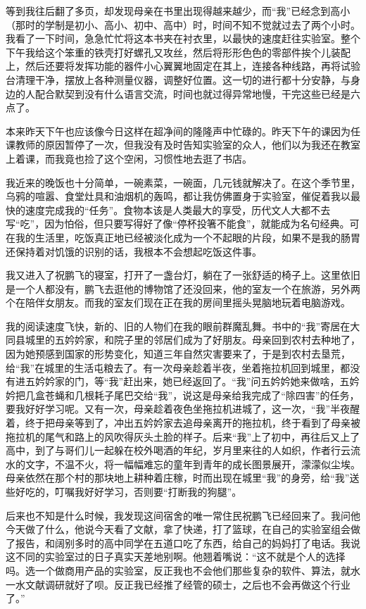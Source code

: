 \documentclass[openany,scheme = chinese, linespread = 1.5]{ctexbook}
\begin{document}
等到我往后翻了多页，却发现母亲在书里出现得越来越少，而“我”已经念到高小（那时的学制是初小、高小、初中、高中）时，时间不知不觉就过去了两个小时。我看了一下时间，急急忙忙将这本书夹在衬衣里，以最快的速度赶往实验室。整个下午我给这个笨重的铁壳打好螺孔又攻丝，然后将形形色色的零部件挨个儿装配上，然后还要将发挥功能的器件小心翼翼地固定在其上，连接各种线路，再将试验台清理干净，摆放上各种测量仪器，调整好位置。这一切的进行都十分安静，与身边的人配合默契到没有什么语言交流，时间也就过得异常地慢，干完这些已经是六点了。

本来昨天下午也应该像今日这样在超净间的隆隆声中忙碌的。昨天下午的课因为任课教师的原因暂停了一次，但我没有及时告知实验室的众人，他们以为我还在教室上着课，而我竟也捡了这个空闲，习惯性地去逛了书店。


我近来的晚饭也十分简单，一碗素菜，一碗面，几元钱就解决了。在这个季节里，乌鸦的喧嚣、食堂灶具和油烟机的轰鸣，都让我仿佛置身于实验室，催促着我以最快的速度完成我的“任务”。食物本该是人类最大的享受，历代文人大都不去写“吃”，因为怕俗，但只要写得好了像“停杯投箸不能食”，就能成为名句经典。可在我的生活里，吃饭真正地已经被淡化成为一个不起眼的片段，如果不是我的肠胃还保持着对饥饿的识别的话，我根本不会想起吃饭这件事。

我又进入了祝鹏飞的寝室，打开了一盏台灯，躺在了一张舒适的椅子上。这里依旧是一个人都没有，鹏飞去逛他的博物馆了还没回来，他的室友一个在旅游，另外两个在陪伴女朋友。而我的室友们现在正在我的房间里摇头晃脑地玩着电脑游戏。

我的阅读速度飞快，新的、旧的人物们在我的眼前群魔乱舞。书中的“我”寄居在大同县城里的五妗妗家，和院子里的邻居们成为了好朋友。母亲回到农村去种地了，因为她预感到国家的形势变化，知道三年自然灾害要来了，于是到农村去垦荒，给“我”在城里的生活屯粮去了。有一次母亲趁着半夜，坐着拖拉机回到城里，都没有进五妗妗家的门，等“我”赶出来，她已经返回了。“我”问五妗妗她来做啥，五妗妗把几盒苍蝇和几根耗子尾巴交给“我”，说这是母亲给我完成了“除四害”的任务，要我好好学习呢。又有一次，母亲趁着夜色坐拖拉机进城了，这一次，“我”半夜醒着，终于把母亲等到了，冲出五妗妗家去追母亲离开的拖拉机，终于看到了母亲被拖拉机的尾气和路上的风吹得灰头土脸的样子。后来“我”上了初中，再往后又上了高中，到了与哥们儿一起躲在校外喝酒的年纪，岁月里来往的人如织，作者行云流水的文字，不温不火，将一幅幅难忘的童年到青年的成长图景展开，濛濛似尘埃。母亲依然在那个村的那块地上耕种着庄稼，时而出现在城里“我”的身旁，给“我”送些好吃的，叮嘱我好好学习，否则要“打断我的狗腿”。

后来也不知是什么时候，我发现这间宿舍的唯一常住民祝鹏飞已经回来了。我问他今天做了什么，他说今天看了文献，拿了快递，打了篮球，在自己的实验室组会做了报告，和阔别多时的高中同学在五道口吃了东西，给自己的妈妈打了电话。我说这不同的实验室过的日子真实天差地别啊。他翘着嘴说：“这不就是个人的选择吗。选一个做商用产品的实验室，反正我也不会他们那些复杂的软件、算法，就水一水文献调研就好了呗。反正我已经推了经管的硕士，之后也不会再做这个行业了。”
\end{document}
